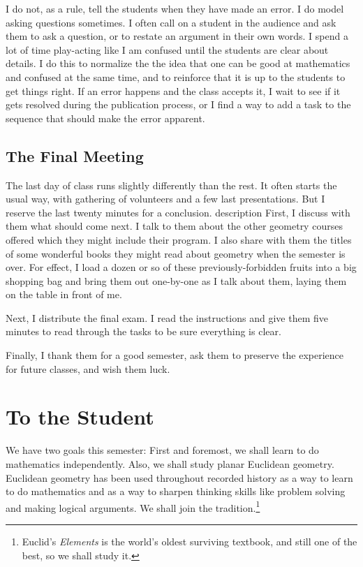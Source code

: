 \begin{annotation}
I do not, as a rule, tell the students when they have made an error. I do model asking questions sometimes. I often call on a student in the audience and ask them to ask a question, or to restate an argument in their own words. I spend a lot of time play-acting like I am confused until the students are clear about details. I do this to normalize the the idea that one can be good at mathematics and confused at the same time, and to reinforce that it is up to the students to get things right. If an error happens and the class accepts it, I wait to see if it gets resolved during the publication process, or I find a way to add a task to the sequence that should make the error apparent. 

\section*{The Final Meeting}

The last day of class runs slightly differently than the rest. It often starts the usual way, with gathering of volunteers and a few last presentations. But I reserve the last twenty minutes for a conclusion.
description
First, I discuss with them what should come next. I talk to them about the other geometry courses offered which they might include their program. I also share with them the titles of some wonderful books they might read about geometry when the semester is over. For effect, I load a dozen or so of these previously-forbidden fruits into a big shopping bag and bring them out one-by-one as I talk about them, laying them on the table in front of me.

Next, I distribute the final exam. I read the instructions and give them five minutes to read through the tasks to be sure everything is clear. 

Finally, I thank them for a good semester, ask them to preserve the experience for future classes, and wish them luck.






\end{annotation}



\chapter{To the Student}

We have two goals this semester:
First and foremost, we shall learn to do mathematics independently.
Also, we shall study planar Euclidean geometry.
Euclidean geometry has been used throughout recorded history as a way to learn to do mathematics and as a way to sharpen thinking skills like problem solving and making logical arguments.
We shall join the tradition.\footnote{Euclid's \emph{Elements} is the world's oldest surviving textbook, and still one of the best, so we shall study it.}

